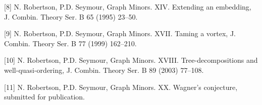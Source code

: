 [8] N. Robertson, P.D. Seymour, Graph Minors. XIV. Extending an embedding, J. Combin. Theory Ser. B 65 (1995) 23--50.

[9] N. Robertson, P.D. Seymour, Graph Minors. XVII. Taming a vortex, J. Combin. Theory Ser. B 77 (1999) 162--210.

[10] N. Robertson, P.D. Seymour, Graph Minors. XVIII. Tree-decompositions and well-quasi-ordering, J. Combin. Theory Ser. B 89 (2003) 77--108.

[11] N. Robertson, P.D. Seymour, Graph Minors. XX. Wagner's conjecture, submitted for publication.

